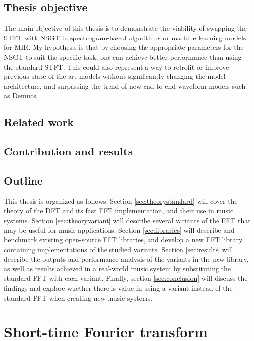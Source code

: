 \documentclass[letter,12pt,notitlepage]{article}
\begin{document}
\subsection{Thesis objective}

The main objective of this thesis is to demonstrate the viability of swapping the STFT with NSGT in spectrogram-based algorithms or machine learning models for MIR. My hypothesis is that by choosing the appropriate parameters for the NSGT to suit the specific task, one can achieve better performance than using the standard STFT. This could also represent a way to retrofit or improve previous state-of-the-art models without significantly changing the model architecture, and surpassing the trend of new end-to-end waveform models such as Demucs.

\subsection{Related work}

\subsection{Contribution and results}

\subsection{Outline}

This thesis is organized as follows. Section \ref{sec:theorystandard} will cover the theory of the DFT and its fast FFT implementation, and their use in music systems. Section \ref{sec:theoryvariant} will describe several variants of the FFT that may be useful for music applications. Section \ref{sec:libraries} will describe and benchmark existing open-source FFT libraries, and develop a new FFT library containing implementations of the studied variants. Section \ref{sec:results} will describe the outputs and performance analysis of the variants in the new library, as well as results achieved in a real-world music system by substituting the standard FFT with each variant. Finally, section \ref{sec:conclusion} will discuss the findings and explore whether there is value in using a variant instead of the standard FFT when creating new music systems.

\vfill
\clearpage

\section{Short-time Fourier transform}
\label{sec:theorystft}
\end{document}
